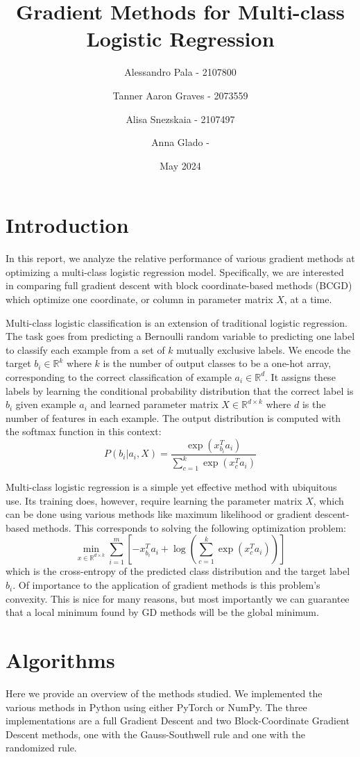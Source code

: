 \documentclass{article}
\title{Gradient Methods for Multi-class Logistic Regression}
\author{Alessandro Pala - 2107800 \and 
Tanner Aaron Graves - 2073559 \and 
Alisa Snezskaia - 2107497 \and
Anna Glado - }
\date{May 2024}
\begin{document}
\maketitle

\section{Introduction}
In this report, we analyze the relative performance of various gradient methods at optimizing a multi-class logistic regression model. Specifically, we are interested in comparing full gradient descent with block coordinate-based methods (BCGD) which optimize one coordinate, or column in parameter matrix $X$, at a time. 

Multi-class logistic classification is an extension of traditional logistic regression. The task goes from predicting a Bernoulli random variable to predicting one label to classify each example from a set of $k$ mutually exclusive labels. We encode the target $b_i \in \mathbb{R}^k$ where $k$ is the number of output classes to be a one-hot array, corresponding to the correct classification of example $a_i \in \mathbb{R}^d$. It assigns these labels by learning the conditional probability distribution that the correct label is $b_i$ given example $a_i$ and learned parameter matrix $X \in \mathbb{R}^{d \times k}$ where $d$ is the number of features in each example. The output distribution is computed with the softmax function in this context: 
$$P(b_i|a_i, X) = \frac{\exp(x_{b_i}^T a_i)}{\sum_{c=1}^k\exp(x_c^T a_i)}$$

Multi-class logistic regression is a simple yet effective method with ubiquitous use. Its training does, however, require learning the parameter matrix $X$, which can be done using various methods like maximum likelihood or gradient descent-based methods. This corresponds to solving the following optimization problem:
$$\min_{x \in \mathbb{R}^{d \times k}} \sum\limits_{i=1}^{m}[-x^T_{b_i}a_i + \log(\sum\limits_{c=1}^k\exp(x_c^T a_i))]$$
which is the cross-entropy of the predicted class distribution and the target label $b_i$. Of importance to the application of gradient methods is this problem's convexity. This is nice for many reasons, but most importantly we can guarantee that a local minimum found by GD methods will be the global minimum.

\section{Algorithms}
Here we provide an overview of the methods studied. We implemented the various methods in Python using either PyTorch or NumPy. The three implementations are a full Gradient Descent and two Block-Coordinate Gradient Descent methods, one with the Gauss-Southwell rule and one with the randomized rule.  
\end{document}
